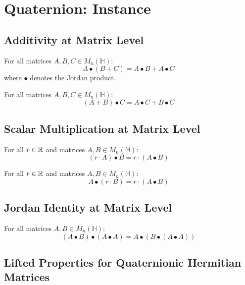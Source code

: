 \section{Quaternion: Instance}

\subsection{Additivity at Matrix Level}

\begin{theorem}
For all matrices $A, B, C \in M_n(\mathbb{H})$:
\[ A \bullet (B + C) = A \bullet B + A \bullet C \]
where $\bullet$ denotes the Jordan product.
\end{theorem}

\begin{theorem}
For all matrices $A, B, C \in M_n(\mathbb{H})$:
\[ (A + B) \bullet C = A \bullet C + B \bullet C \]
\end{theorem}

\subsection{Scalar Multiplication at Matrix Level}

\begin{theorem}
For all $r \in \mathbb{R}$ and matrices $A, B \in M_n(\mathbb{H})$:
\[ (r \cdot A) \bullet B = r \cdot (A \bullet B) \]
\end{theorem}

\begin{theorem}
For all $r \in \mathbb{R}$ and matrices $A, B \in M_n(\mathbb{H})$:
\[ A \bullet (r \cdot B) = r \cdot (A \bullet B) \]
\end{theorem}

\subsection{Jordan Identity at Matrix Level}

\begin{theorem}
For all matrices $A, B \in M_n(\mathbb{H})$:
\[ (A \bullet B) \bullet (A \bullet A) = A \bullet (B \bullet (A \bullet A)) \]
\end{theorem}

\subsection{Lifted Properties for Quaternionic Hermitian Matrices}

